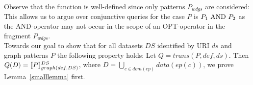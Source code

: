\begin{enumerate}
\end{enumerate}
Observe that the function is well-defined since only patterns $P_{wdgs}$ are
considered: This allows us to argue over conjunctive queries for the case $P$ is $P_1
\mbox{ AND } P_2$ as the AND-operator may not occur in the scope of an OPT-operator in the fragment
$P_{wdgs}$. \\
Towards our goal to show that for all datasets $DS$ identified by URI
$ds$ and graph patterns $P$ the following property holds: 
Let $Q = trans(P,def,ds)$. Then $Q(D) = \llbracket P
\rrbracket^{DS}_{graph(def,DS)}$, where $D=\bigcup\limits_{c \in dom(ep)} data(ep(c))$, we prove Lemma~\ref{smalllemma} first.

